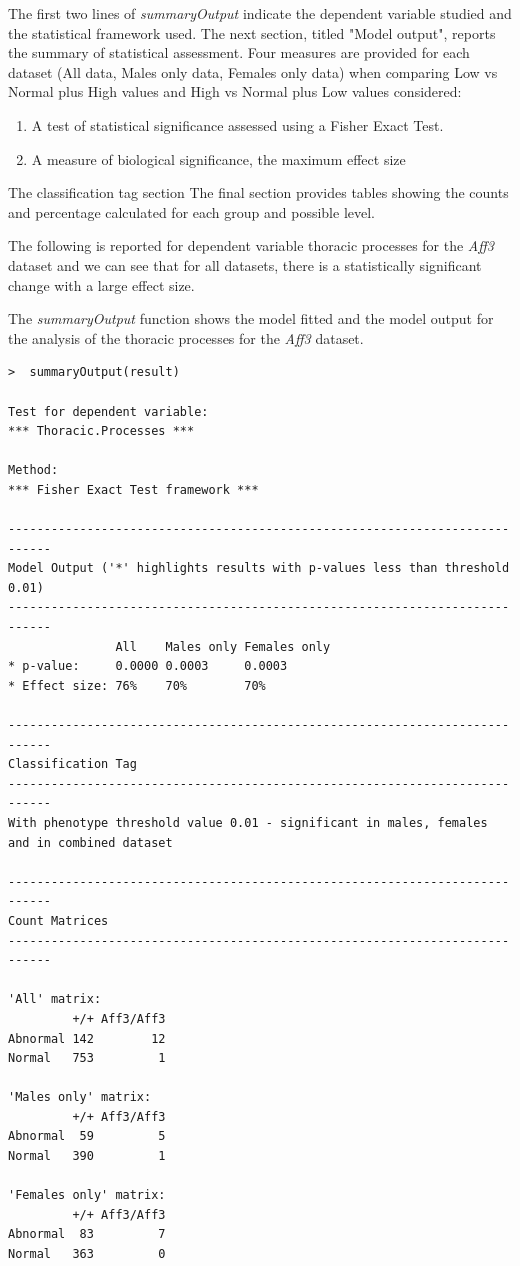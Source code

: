 \documentclass[12pt,a4paper]{article}
\begin{document}
The first two lines of \textit{summaryOutput} indicate the dependent variable studied and the statistical framework used.  
The next section, titled "Model output", reports the summary of statistical assessment. Four measures are provided for each dataset (All data, Males only data, Females only data) when comparing Low vs Normal plus High values and High vs Normal plus Low values considered:
\begin{enumerate}
\item A test of statistical significance assessed using a Fisher Exact Test. 
\item A measure of biological significance, the maximum effect size
\end{enumerate}
The classification tag section 
The final section provides tables showing the counts and percentage calculated for each group and possible level. 

The following is reported for dependent variable thoracic processes for the \textit{Aff3} dataset and we can see that for all datasets, there is a statistically significant change with a large effect size. 

The \textit{summaryOutput} function shows the model fitted and the model output for the analysis of the thoracic processes for the \textit{Aff3} dataset. 

\begingroup
    \fontsize{8pt}{12pt}\selectfont
\begin{verbatim}
>  summaryOutput(result)

Test for dependent variable:
*** Thoracic.Processes ***

Method:
*** Fisher Exact Test framework ***

----------------------------------------------------------------------------
Model Output ('*' highlights results with p-values less than threshold 0.01)
----------------------------------------------------------------------------
               All    Males only Females only
* p-value:     0.0000 0.0003     0.0003      
* Effect size: 76%    70%        70%         

----------------------------------------------------------------------------
Classification Tag
----------------------------------------------------------------------------
With phenotype threshold value 0.01 - significant in males, females and in combined dataset

----------------------------------------------------------------------------
Count Matrices
----------------------------------------------------------------------------

'All' matrix:
         +/+ Aff3/Aff3
Abnormal 142        12
Normal   753         1

'Males only' matrix:
         +/+ Aff3/Aff3
Abnormal  59         5
Normal   390         1

'Females only' matrix:
         +/+ Aff3/Aff3
Abnormal  83         7
Normal   363         0
\end{verbatim}
\endgroup 
\end{document}
